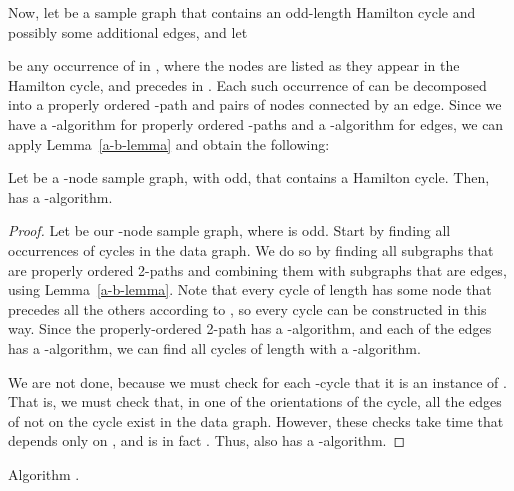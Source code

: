Now, let  be a sample graph that contains an odd-length Hamilton cycle and possibly some additional edges, and let

be any occurrence of  in , where the nodes are listed as they appear in the Hamilton cycle, and  precedes  in . Each such occurrence of  can be decomposed into a properly ordered -path  and  pairs of nodes connected by an edge. Since we have a -algorithm for properly ordered -paths and a -algorithm for edges, we can apply Lemma~\ref{a-b-lemma} and obtain the following:

\begin{theorem}\label{cor-oddenum}
Let  be a -node sample graph, with  odd, that contains a Hamilton cycle. Then,  has a -algorithm.
\end{theorem}

\begin{proof}
Let  be our -node sample graph, where  is odd.  Start by finding all occurrences of cycles  in the data graph.  We do so by finding all subgraphs that are properly ordered 2-paths and combining them with  subgraphs that are edges, using Lemma~\ref{a-b-lemma}.  Note that every cycle of length  has some node that precedes all the others according to , so every cycle can be constructed in this way.  Since the properly-ordered 2-path has a -algorithm, and each of the edges has a -algorithm, we can find all cycles of length  with a -algorithm.

We are not done, because we must check for each -cycle that it is an instance of .  That is, we must check that, in one of the  orientations of the cycle, all the edges of  not on the cycle exist in the data graph.  However, these checks take time that depends only on , and is in fact .  Thus,  also has a -algorithm.
\end{proof}


\begin{algorithm}[t]
\SetAlgoNoLine
{}


\caption{Algorithm .}
\label{alg:odd-cycle-enum}
\end{algorithm}

